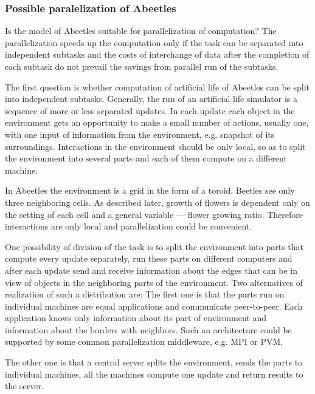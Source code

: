 \subsubsection{Possible paralelization of Abeetles}

Is the model of Abeetles suitable for parallelization of computation? The parallelization speeds up the computation only if the task can be separated into independent subtasks and the costs of interchange of data after the completion of each subtask do not prevail the savings from parallel run of the subtasks.

The first question is whether computation of artificial life of Abeetles can be split into independent subtasks. Generally, the run of an artificial life simulator is a sequence of more or less separated updates. In each update each  object in the environment gets an opportunity to make a small number of actions, usually one, with one input of information from the environment, e.g. snapshot of its surroundings. Interactions in the environment should be only local, so as to split the environment into several parts and each of them compute on a different machine. 

In Abeetles the environment is a grid in the form of a toroid. Beetles see only three neighboring cells. As described later, growth of flowers is dependent only on the setting of each cell and a general variable --- flower growing ratio. Therefore interactions are only local and parallelization could be convenient. 

One possibility of division of the task is to split the environment into parts that compute every update separately, run these parts on different computers and after each update send and receive information about the edges that can be in view of objects in the neighboring parts of the environment. Two alternatives of realization of such a distribution are: The first one is that the parts run on individual machines are equal applications and communicate peer-to-peer. Each application knows only information about its part of environment and information about the borders with neighbors. Such an architecture could be supported by some common parallelization middleware, e.g. MPI or PVM.


The other one is that a central server splits the environment, sends the parts to individual machines, all the machines compute one update and return results to the server.

